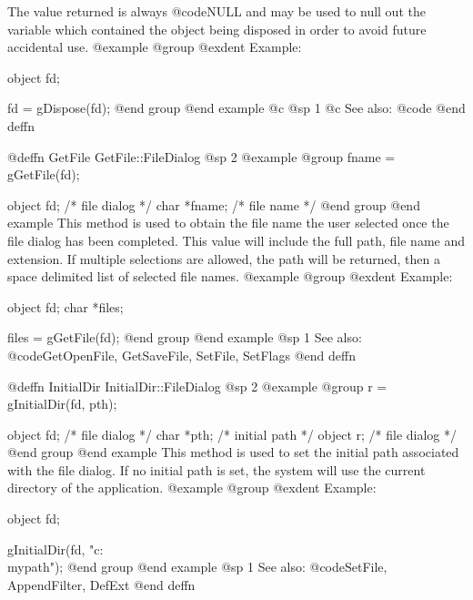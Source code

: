 The value returned is always @code{NULL} and may be used to null out
the variable which contained the object being disposed in order to
avoid future accidental use.
@example
@group
@exdent Example:

object  fd;

fd = gDispose(fd);
@end group
@end example
@c @sp 1
@c See also:  @code{}
@end deffn











@deffn {GetFile} GetFile::FileDialog
@sp 2
@example
@group
fname = gGetFile(fd);

object  fd;     /*  file dialog  */
char    *fname; /*  file name    */
@end group
@end example
This method is used to obtain the file name the user selected once the
file dialog has been completed.  This value will include the full path,
file name and extension.  If multiple selections are allowed, the path
will be returned, then a space delimited list of selected file names.
@example
@group
@exdent Example:

object  fd;
char    *files;

files = gGetFile(fd);
@end group
@end example
@sp 1
See also:  @code{GetOpenFile, GetSaveFile, SetFile, SetFlags}
@end deffn















@deffn {InitialDir} InitialDir::FileDialog
@sp 2
@example
@group
r = gInitialDir(fd, pth);

object  fd;     /*  file dialog  */
char    *pth;   /*  initial path */
object  r;      /*  file dialog  */
@end group
@end example
This method is used to set the initial path associated with the file dialog.
If no initial path is set, the system will use the current directory of
the application.
@example
@group
@exdent Example:

object  fd;

gInitialDir(fd, "c:\\mypath");
@end group
@end example
@sp 1
See also:  @code{SetFile, AppendFilter, DefExt}
@end deffn







